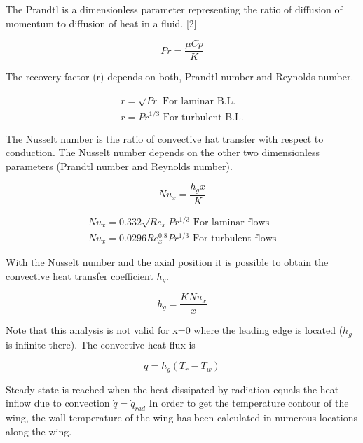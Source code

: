 The Prandtl is a dimensionless parameter representing the ratio of diffusion of momentum to diffusion of heat in a fluid. [2]

\begin{equation}
Pr=\frac{\mu Cp}{K}
\end{equation}

The recovery factor (r) depends on both, Prandtl number and Reynolds number.

\begin{equation}
\begin{split}
r=\sqrt{Pr} \text{  For laminar B.L.}	\\
r=Pr^{1/3} \text{  For turbulent B.L.}
\end{split}
\end{equation}

The Nusselt number is the ratio of convective hat transfer with respect to conduction. The Nusselt number depends on the other two dimensionless parameters (Prandtl number and Reynolds number).

\begin{equation}
Nu_x=\frac{h_g x}{K}
\end{equation}

\begin{equation}
\begin{split}
Nu_x=0.332\sqrt{Re_x} Pr^{1/3}	\text{  For laminar flows} \\
Nu_x=0.0296Re_x^{0.8} Pr^{1/3}	\text{  For turbulent flows}
\end{split}
\end{equation}

With the Nusselt number and the axial position it is possible to obtain the convective heat transfer coefficient $h_g$.

\begin{equation}
h_g=\frac{K Nu_x}{x}
\end{equation}

Note that this analysis is not valid for x=0 where the leading edge is located ($h_g$ is infinite there).
The convective heat flux is 

\begin{equation}
\dot{q}=h_g (T_r-T_w)
\end{equation}


Steady state is reached when the heat dissipated by radiation equals the heat inflow due to convection $\dot{q}=\dot{q}_{rad}$
In order to get the temperature contour of the wing, the wall temperature of the wing has been calculated in numerous locations along the wing.